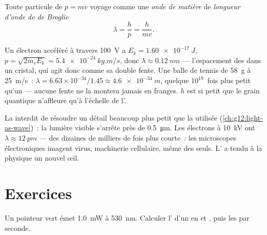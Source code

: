 \begin{definition}\label{def:g12:quantum-world:debroglie}
Toute particule de  $p = mv$
voyage comme une \emph{onde de matière} de
\emph{longueur d'onde de de Broglie}
\[
\lambda = \frac{h}{p} = \frac{h}{mv}.
\]
\end{definition}
\admitted

\begin{example}\label{ex:g12:quantum-world:never}
Un électron accéléré à travers \qty{100}{V} a $E_k = \qty{1.60e-17}{J}$,
$p = \sqrt{2m_e E_k} = \qty{5.4e-24}{kg.m/s}$, donc $\lambda \approx
\qty{0.12}{nm}$ --- l'espacement des
 dans un cristal, qui agit donc comme
sa double fente. Une balle de tennis de \qty{58}{g} à \qty{25}{m/s}~:
$\lambda = 6.63\times10^{-34}/1.45 \approx \qty{4.6e-34}{m}$, quelque
$10^{19}$~fois plus petit qu'un
 --- aucune fente ne la montera jamais
en franges. $h$ est si petit que le grain quantique n'affleure qu'à
l'échelle de l'.
\end{example}

\begin{example}\label{ex:g12:quantum-world:microscope}
La  interdit de résoudre un détail
beaucoup plus petit que la 
utilisée (\cref{ch:g12:light-as-wave})~: la lumière visible s'arrête
près de \qty{0.5}{\micro m}. Les électrons à \qty{10}{kV} ont
$\lambda \approx \qty{12}{pm}$ --- des dizaines de milliers de fois
plus courte~: les microscopes électroniques imagent virus, machinerie
cellulaire, même des  seuls.
L' a tendu à la physique un nouvel
œil.
\end{example}

\section{Exercices}

\begin{exercise}[$\star$]\label{exo:g12:quantum-world:1}
Un pointeur  vert émet \qty{1.0}{mW} à
\qty{530}{nm}. Calculer l' d'un
 en  et
, puis les  par seconde.
\end{exercise}

